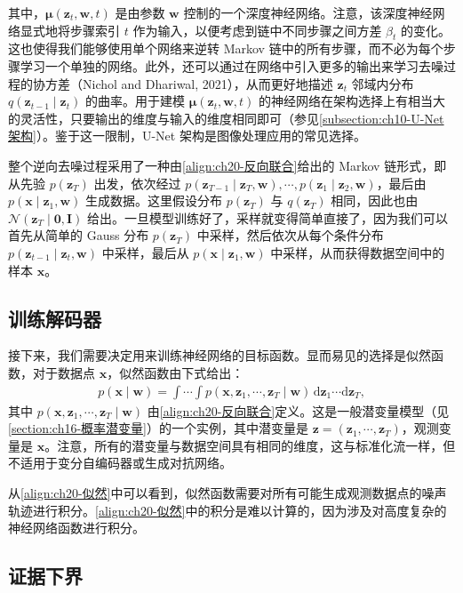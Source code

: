 \documentclass[../../main.tex]{subfiles}
\begin{document}
其中，$\bm{\mu}(\bm{z}_t,\bm{w},t)$ 是由参数 $\bm{w}$ 控制的一个深度神经网络。注意，该深度神经网络显式地将步骤索引 $t$ 作为输入，以便考虑到链中不同步骤之间方差 $\beta_t$ 的变化。这也使得我们能够使用单个网络来逆转 Markov 链中的所有步骤，而不必为每个步骤学习一个单独的网络。此外，还可以通过在网络中引入更多的输出来学习去噪过程的协方差（Nichol and Dhariwal, 2021），从而更好地描述 $\bm{z}_t$ 邻域内分布 $q(\bm{z}_{t-1}\mid\bm{z}_t)$ 的曲率。用于建模 $\bm{\mu}(\bm{z}_t,\bm{w},t)$ 的神经网络在架构选择上有相当大的灵活性，只要输出的维度与输入的维度相同即可（参见\cref{subsection:ch10-U-Net架构}）。鉴于这一限制，U-Net 架构是图像处理应用的常见选择。

整个逆向去噪过程采用了一种由\eqref{align:ch20-反向联合}给出的 Markov 链形式，即从先验 $p(\bm{z}_T)$ 出发，依次经过 $p(\bm{z}_{T-1}\mid\bm{z}_T,\bm{w}),\cdots,p(\bm{z}_1\mid\bm{z}_2,\bm{w})$，最后由 $p(\bm{x}\mid\bm{z}_1,\bm{w})$ 生成数据。这里假设分布 $p(\bm{z}_T)$ 与 $q(\bm{z}_T)$ 相同，因此也由 $\mathcal{N}(\bm{z}_T\mid\bm{0},\bm{I})$ 给出。一旦模型训练好了，采样就变得简单直接了，因为我们可以首先从简单的 Gauss 分布 $p(\bm{z}_T)$ 中采样，然后依次从每个条件分布 $p(\bm{z}_{t-1}\mid\bm{z}_t,\bm{w})$ 中采样，最后从 $p(\bm{x}\mid\bm{z}_1,\bm{w})$ 中采样，从而获得数据空间中的样本 $\bm{x}$。

\subsection{训练解码器}\label{subsection:ch20-训练解码器}

接下来，我们需要决定用来训练神经网络的目标函数。显而易见的选择是似然函数，对于数据点 $\bm{x}$，似然函数由下式给出：
\begin{align}
p(\bm{x}\mid\bm{w})=\int\cdots\int p(\bm{x},\bm{z}_1,\cdots,\bm{z}_T\mid\bm{w})\,\mathrm{d}\bm{z}_1\cdots\mathrm{d}\bm{z}_T,
\label{align:ch20-似然}
\end{align}
其中 $p(\bm{x},\bm{z}_1,\cdots,\bm{z}_T\mid\bm{w})$ 由\eqref{align:ch20-反向联合}定义。这是一般潜变量模型（见\cref{section:ch16-概率潜变量}）的一个实例，其中潜变量是 $\bm{z}=(\bm{z}_1,\cdots,\bm{z}_T)$，观测变量是 $\bm{x}$。注意，所有的潜变量与数据空间具有相同的维度，这与标准化流一样，但不适用于变分自编码器或生成对抗网络。

从\eqref{align:ch20-似然}中可以看到，似然函数需要对所有可能生成观测数据点的噪声轨迹进行积分。\eqref{align:ch20-似然}中的积分是难以计算的，因为涉及对高度复杂的神经网络函数进行积分。

\subsection{证据下界}\label{subsection:ch20-证据下界}
\end{document}
